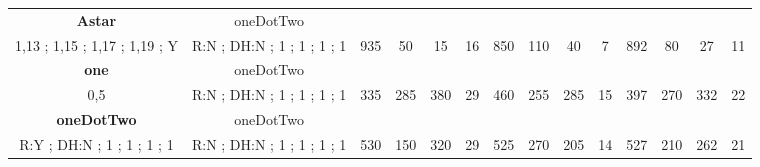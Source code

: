 \begin{table}[]
{\begin{tabular}{|c|c|c|c|c|c|c|c|c|c|c|c|c|c|}
\cellcolor{blue!15}\textbf{Astar} & oneDotTwo& {\color[HTML]{00009B} } & {\color[HTML]{9A0000} } & {\color[HTML]{009901} } &  & {\color[HTML]{00009B} } & {\color[HTML]{9A0000} } & {\color[HTML]{009901} } &  & {\color[HTML]{00009B} } & {\color[HTML]{9A0000} } & {\color[HTML]{009901} } &  \\ 
\cellcolor{ blue!15}1,13 ; 1,15 ; 1,17 ; 1,19 ; Y & R:N ; DH:N ; 1 ; 1 ; 1 ; 1 & \multirow{-2}{*}{{\color[HTML]{00009B} 935}} & \multirow{-2}{*}{{\color[HTML]{9A0000} 50}} & \multirow{-2}{*}{{\color[HTML]{009901} 15}} & \multirow{-2}{*}{16} & \multirow{-2}{*}{{\color[HTML]{00009B} 850}} & \multirow{-2}{*}{{\color[HTML]{9A0000} 110}} & \multirow{-2}{*}{{\color[HTML]{009901} 40}} & \multirow{-2}{*}{7} & \multirow{-2}{*}{{\color[HTML]{00009B} 892}} & \multirow{-2}{*}{{\color[HTML]{9A0000} 80}} & \multirow{-2}{*}{{\color[HTML]{009901} 27}} & \multirow{-2}{*}{11} \\ \hline

\cellcolor{blue!15}\textbf{one} & oneDotTwo& {\color[HTML]{00009B} } & {\color[HTML]{9A0000} } & {\color[HTML]{009901} } &  & {\color[HTML]{00009B} } & {\color[HTML]{9A0000} } & {\color[HTML]{009901} } &  & {\color[HTML]{00009B} } & {\color[HTML]{9A0000} } & {\color[HTML]{009901} } &  \\ 
\cellcolor{ blue!15}0,5 & R:N ; DH:N ; 1 ; 1 ; 1 ; 1 & \multirow{-2}{*}{{\color[HTML]{00009B} 335}} & \multirow{-2}{*}{{\color[HTML]{9A0000} 285}} & \multirow{-2}{*}{{\color[HTML]{009901} 380}} & \multirow{-2}{*}{29} & \multirow{-2}{*}{{\color[HTML]{00009B} 460}} & \multirow{-2}{*}{{\color[HTML]{9A0000} 255}} & \multirow{-2}{*}{{\color[HTML]{009901} 285}} & \multirow{-2}{*}{15} & \multirow{-2}{*}{{\color[HTML]{00009B} 397}} & \multirow{-2}{*}{{\color[HTML]{9A0000} 270}} & \multirow{-2}{*}{{\color[HTML]{009901} 332}} & \multirow{-2}{*}{22} \\ \hline

\cellcolor{blue!15}\textbf{oneDotTwo} & oneDotTwo& {\color[HTML]{00009B} } & {\color[HTML]{9A0000} } & {\color[HTML]{009901} } &  & {\color[HTML]{00009B} } & {\color[HTML]{9A0000} } & {\color[HTML]{009901} } &  & {\color[HTML]{00009B} } & {\color[HTML]{9A0000} } & {\color[HTML]{009901} } &  \\ 
\cellcolor{ blue!15}R:Y ; DH:N ; 1 ; 1 ; 1 ; 1 & R:N ; DH:N ; 1 ; 1 ; 1 ; 1 & \multirow{-2}{*}{{\color[HTML]{00009B} 530}} & \multirow{-2}{*}{{\color[HTML]{9A0000} 150}} & \multirow{-2}{*}{{\color[HTML]{009901} 320}} & \multirow{-2}{*}{29} & \multirow{-2}{*}{{\color[HTML]{00009B} 525}} & \multirow{-2}{*}{{\color[HTML]{9A0000} 270}} & \multirow{-2}{*}{{\color[HTML]{009901} 205}} & \multirow{-2}{*}{14} & \multirow{-2}{*}{{\color[HTML]{00009B} 527}} & \multirow{-2}{*}{{\color[HTML]{9A0000} 210}} & \multirow{-2}{*}{{\color[HTML]{009901} 262}} & \multirow{-2}{*}{21} \\ \hline


\end{tabular}}
\end{table}
